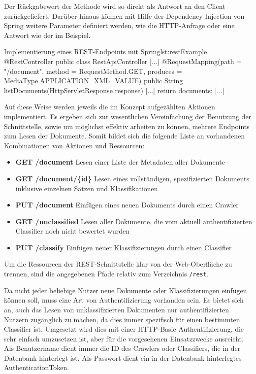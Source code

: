 Der Rückgabewert der Methode wird so direkt als Antwort an den Client zurückgeliefert.
Darüber hinaus können mit Hilfe der Dependency-Injection von Spring weitere Parameter
definiert werden, wie die HTTP-Anfrage oder eine Antwort wie der im Beispiel.
\vspace{1em}

\begin{java}{Implementierung eines REST-Endpoints mit Spring}{lst:restExample}
@RestController
public class RestApiController {
	[...]
	@RequestMapping(path = "/document", method = RequestMethod.GET, produces = MediaType.APPLICATION_XML_VALUE)
	public String listDocuments(HttpServletResponse response) {
		[...]
		return documents;
	}
	[...]
}
\end{java}

Auf diese Weise werden jeweils die im Konzept aufgezählten Aktionen implementiert.
Es ergeben sich zur wesentlichen Vereinfachung der Benutzung der Schnittstelle,
sowie um möglichst effektiv arbeiten zu können, mehrere Endpoints zum Lesen
der Dokumente. Somit bildet sich die folgende Liste an vorhandenen
Kombinationen von Aktionen und Ressourcen:

\begin{itemize}
	\item \textbf{GET /document}
	Lesen einer Liste der Metadaten aller Dokumente
	\item \textbf{GET /document/\{id\}}
	Lesen eines vollständigen, spezifizierten Dokuments inklusive
	einzelnen Sätzen und Klassifikationen
	\item \textbf{PUT /document}
	Einfügen eines neuen Dokuments durch einen Crawler
	\item \textbf{GET /unclassified}
	Lesen aller Dokumente, die vom aktuell authentifizierten Classifier
	noch nicht bewertet wurden
	\item \textbf{PUT /classify}
	Einfügen neuer Klassifizierungen durch einen Classifier
\end{itemize}

Um die Ressourcen der REST-Schnittstelle klar von der Web-Oberfläche zu trennen,
sind die angegebenen Pfade relativ zum Verzeichnis \texttt{/rest}.

Da nicht jeder beliebige Nutzer neue Dokumente oder Klassifizierungen einfügen
können soll, muss eine Art von Authentifizierung vorhanden sein.
Es bietet sich an, auch das Lesen von unklassifizierten Dokumenten nur authentifizierten
Nutzern zugänglich zu machen, da dies immer spezifisch
für einen bestimmten Classifier ist.
Umgesetzt wird dies mit einer HTTP-Basic Authentifizierung, die sehr einfach umzusetzen
ist, aber für die vorgesehenen Einsatzzwecke ausreicht.
Als Benutzername dient immer die ID des Crawlers oder Classifiers, die in der Datenbank
hinterlegt ist. Als Passwort dient ein in der Datenbank hinterlegtes AuthenticationToken.

